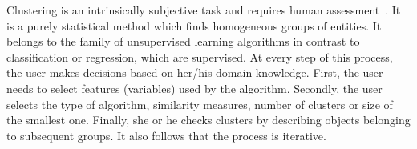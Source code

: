 \documentclass[
 twocolumn,
 hf,
]{ceurart}
\begin{document}
Clustering is an intrinsically subjective task and requires human assessment~\cite{10.1145/3340960}.
It is a purely statistical method which finds homogeneous groups of entities.
It belongs to the family of unsupervised learning algorithms in contrast to classification or regression, which are supervised.
At every step of this process, the user makes decisions based on her/his domain knowledge.
First, the user needs to select features (variables) used by the algorithm.
Secondly, the user selects the type of algorithm, similarity measures, number of clusters or size of the smallest one.
Finally, she or he checks clusters by describing objects belonging to subsequent groups.
It also follows that the process is iterative.
\end{document}
